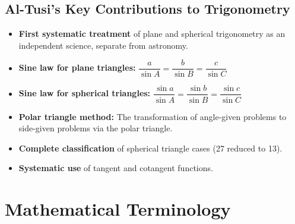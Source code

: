 \documentclass[11pt,a4paper]{article}
\theoremstyle{plain}
\theoremstyle{definition}
\theoremstyle{remark}
\begin{document}
\subsection*{Al-Tusi's Key Contributions to Trigonometry}

\begin{itemize}
\item \textbf{First systematic treatment} of plane and spherical trigonometry as an independent science, separate from astronomy.
\item \textbf{Sine law for plane triangles:} $\dfrac{a}{\sin A} = \dfrac{b}{\sin B} = \dfrac{c}{\sin C}$
\item \textbf{Sine law for spherical triangles:} $\dfrac{\sin a}{\sin A} = \dfrac{\sin b}{\sin B} = \dfrac{\sin c}{\sin C}$
\item \textbf{Polar triangle method:} The transformation of angle-given problems to side-given problems via the polar triangle.
\item \textbf{Complete classification} of spherical triangle cases (27 reduced to 13).
\item \textbf{Systematic use} of tangent and cotangent functions.
\end{itemize}

\clearpage

\section*{Mathematical Terminology}
\end{document}
